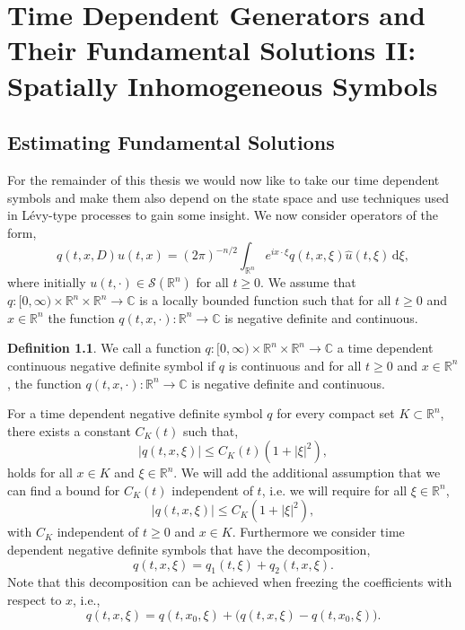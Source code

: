 \documentclass[a4paper, 12pt]{report}
\theoremstyle{remark}
\theoremstyle{definition}
\newtheorem{definition}[theorem]{Definition}
\begin{document}
\chapter{Time Dependent Generators and Their Fundamental Solutions II: Spatially Inhomogeneous Symbols}

\section{Estimating Fundamental Solutions}

For the remainder of this thesis we would now like to take our time dependent symbols and make them also depend on the state space and use techniques used in L\'evy-type processes to gain some insight.  We now consider operators of the form,
\begin{equation}
q(t, x, D)u(t, x) = (2\pi)^{-n/2}\int_{\mathbb{R}^n}e^{ix\cdot\xi}q(t, x, \xi)\hat{u}(t, \xi)\,\mathrm{d}\xi,
\end{equation}
where initially $u(t, \cdot) \in \mathcal{S}(\mathbb{R}^n)$ for all $t \ge 0$.  We assume that $q : [0, \infty) \times \mathbb{R}^n \times \mathbb{R}^n \to \mathbb{C}$ is a locally bounded function such that for all $t \ge 0$ and $x \in \mathbb{R}^n$ the function $q(t, x, \cdot) : \mathbb{R}^n \to \mathbb{C}$ is negative definite and continuous.

\begin{definition}
We call a function $q : [0, \infty) \times \mathbb{R}^n \times \mathbb{R}^n \to \mathbb{C}$ a time dependent continuous negative definite symbol if $q$ is continuous and for all $t \ge 0$ and $x \in \mathbb{R}^n$, the function $q(t, x, \cdot) : \mathbb{R}^n \to \mathbb{C}$ is negative definite and continuous.
\end{definition}

For a time dependent negative definite symbol $q$ for every compact set $K \subset \mathbb{R}^n$, there exists a constant $C_K(t)$ such that,
$$
|q(t, x, \xi)| \le C_K(t)(1 + |\xi|^2),
$$
holds for all $x \in K$ and $\xi \in \mathbb{R}^n$.  We will add the additional assumption that we can find a bound for $C_K(t)$ independent of $t$, i.e. we will require for all $\xi \in \mathbb{R}^n$,
$$
|q(t, x, \xi)| \le C_K(1 + |\xi|^2),
$$
with $C_K$ independent of $t \ge 0$ and $x \in K$.  Furthermore we consider time dependent negative definite symbols that have the decomposition,
\begin{equation}
q(t, x, \xi) = q_1(t, \xi) + q_2(t, x, \xi).
\end{equation}
Note that this decomposition can be achieved when freezing the coefficients with respect to $x$, i.e.,
$$
q(t, x, \xi) = q(t, x_0, \xi) + \big(q(t, x, \xi) - q(t, x_0, \xi)\big).
$$
\end{document}
